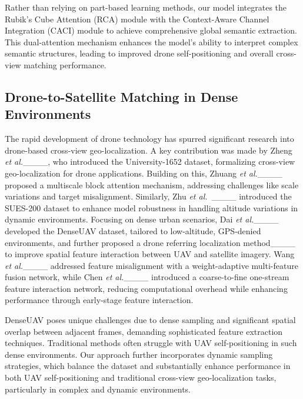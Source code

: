 Rather than relying on part-based learning methods, our model integrates the Rubik's Cube Attention (RCA) module with the Context-Aware Channel Integration (CACI) module to achieve comprehensive global semantic extraction.
This dual-attention mechanism enhances the model's ability to interpret complex semantic structures, leading to improved drone self-positioning and overall cross-view matching performance.


\subsection{Drone-to-Satellite Matching in Dense Environments}
The rapid development of drone technology has spurred significant research into drone-based cross-view geo-localization.
A key contribution was made by Zheng \textit{et al.}____, who introduced the University-1652 dataset, formalizing cross-view geo-localization for drone applications. Building on this, Zhuang \textit{et al.}____ proposed a multiscale block attention mechanism, addressing challenges like scale variations and target misalignment. Similarly, Zhu \textit{et al.}~____ introduced the SUES-200 dataset to enhance model robustness in handling altitude variations in dynamic environments.
Focusing on dense urban scenarios, Dai \textit{et al.}____ developed the DenseUAV dataset, tailored to low-altitude, GPS-denied environments, and further proposed a drone referring localization method____ to improve spatial feature interaction between UAV and satellite imagery. Wang \textit{et al.}____ addressed feature misalignment with a weight-adaptive multi-feature fusion network, while Chen \textit{et al.}____ introduced a coarse-to-fine one-stream feature interaction network, reducing computational overhead while enhancing performance through early-stage feature interaction.

DenseUAV poses unique challenges due to dense sampling and significant spatial overlap between adjacent frames, demanding sophisticated feature extraction techniques.
Traditional methods often struggle with UAV self-positioning in such dense environments.
Our approach further incorporates dynamic sampling strategies, which balance the dataset and substantially enhance performance in both UAV self-positioning and traditional cross-view geo-localization tasks, particularly in complex and dynamic environments.


